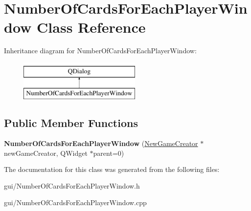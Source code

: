 \hypertarget{classNumberOfCardsForEachPlayerWindow}{}\section{Number\+Of\+Cards\+For\+Each\+Player\+Window Class Reference}
\label{classNumberOfCardsForEachPlayerWindow}
Inheritance diagram for Number\+Of\+Cards\+For\+Each\+Player\+Window\+:\begin{figure}[H]
\begin{center}
\leavevmode
\includegraphics[height=2.000000cm]{classNumberOfCardsForEachPlayerWindow}
\end{center}
\end{figure}
\subsection*{Public Member Functions}
\begin{DoxyCompactItemize}
\item 
\mbox{\label{classNumberOfCardsForEachPlayerWindow_aadd6710e807d6ac5a401c1ecbe51792b}} 
{\bfseries Number\+Of\+Cards\+For\+Each\+Player\+Window} (\hyperlink{classNewGameCreator}{New\+Game\+Creator} $\ast$new\+Game\+Creator, Q\+Widget $\ast$parent=0)
\end{DoxyCompactItemize}


The documentation for this class was generated from the following files\+:\begin{DoxyCompactItemize}
\item 
gui/Number\+Of\+Cards\+For\+Each\+Player\+Window.\+h\item 
gui/Number\+Of\+Cards\+For\+Each\+Player\+Window.\+cpp\end{DoxyCompactItemize}
